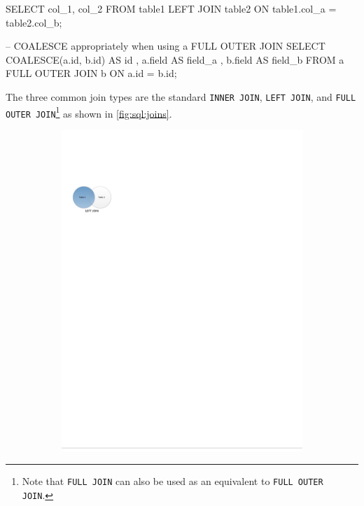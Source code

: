 \begin{SQLcode}
SELECT col_1, col_2
FROM table1
LEFT JOIN table2
	ON table1.col_a = table2.col_b;

-- COALESCE appropriately when using a FULL OUTER JOIN
SELECT COALESCE(a.id, b.id) AS id
	, a.field AS field_a
	, b.field AS field_b
FROM a
FULL OUTER JOIN b
	ON a.id = b.id;
\end{SQLcode}

The three common join types are the standard
\texttt{INNER JOIN}, \texttt{LEFT JOIN},
and \texttt{FULL OUTER JOIN}\footnote{Note that
\texttt{FULL JOIN} can also be used as an equivalent to \texttt{FULL OUTER JOIN}.} as
shown in \cref{fig:sql:joins}.

\begin{figure}[H]
\centering
  \begin{subfigure}[c]{0.3\textwidth}\centering
  \includegraphics[width=\textwidth]{figures/sql/left_join}
  \label{fig:sql:joins:left_join}

\end{subfigure}
\end{figure}
